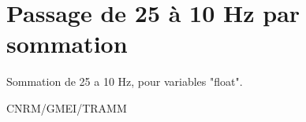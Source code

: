 %
\section{Passage de 25 à 10 Hz par sommation}

 

 Sommation de 25 a 10 Hz, pour variables "float".


\bigskip





CNRM/GMEI/TRAMM

